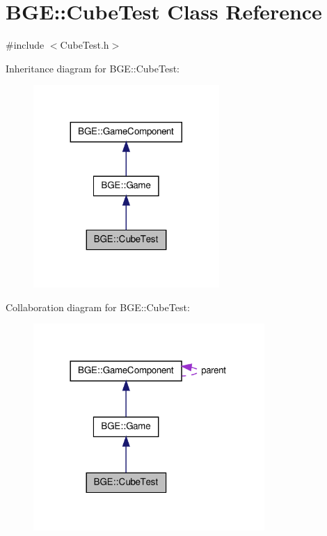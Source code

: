 \hypertarget{class_b_g_e_1_1_cube_test}{\section{B\-G\-E\-:\-:Cube\-Test Class Reference}
\label{class_b_g_e_1_1_cube_test}
}


{\ttfamily \#include $<$Cube\-Test.\-h$>$}



Inheritance diagram for B\-G\-E\-:\-:Cube\-Test\-:
\nopagebreak
\begin{figure}[H]
\begin{center}
\leavevmode
\includegraphics[width=200pt]{class_b_g_e_1_1_cube_test__inherit__graph}
\end{center}
\end{figure}


Collaboration diagram for B\-G\-E\-:\-:Cube\-Test\-:
\nopagebreak
\begin{figure}[H]
\begin{center}
\leavevmode
\includegraphics[width=249pt]{class_b_g_e_1_1_cube_test__coll__graph}
\end{center}
\end{figure}

